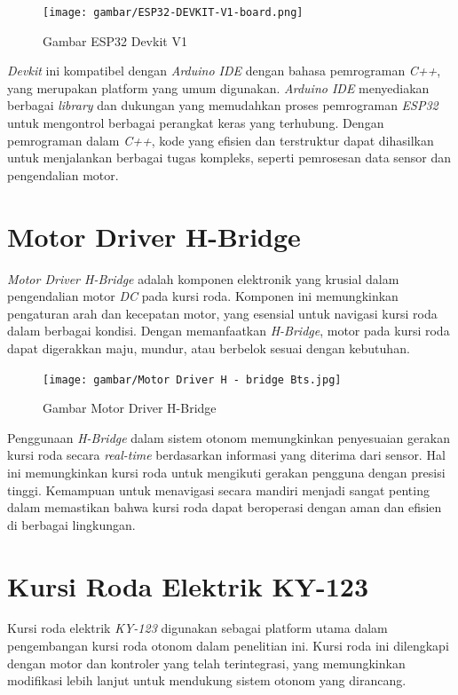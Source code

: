 \begin{figure}[H]
  \centering
  \texttt{[image: gambar/ESP32-DEVKIT-V1-board.png]}
  \caption{Gambar ESP32 Devkit V1}
  \label{fig:Gambar ESP32Devkit V1}
\end{figure}

\emph{Devkit} ini kompatibel dengan \emph{Arduino IDE} dengan bahasa pemrograman \emph{C++}, yang merupakan platform yang umum digunakan. \emph{Arduino IDE} menyediakan berbagai \emph{library} dan dukungan yang memudahkan proses pemrograman \emph{ESP32} untuk mengontrol berbagai perangkat keras yang terhubung. Dengan pemrograman dalam \emph{C++}, kode yang efisien dan terstruktur dapat dihasilkan untuk menjalankan berbagai tugas kompleks, seperti pemrosesan data sensor dan pengendalian motor.

\section{Motor Driver H-Bridge}
\label{sec:Motor}

\emph{Motor Driver H-Bridge} adalah komponen elektronik yang krusial dalam pengendalian motor \emph{DC} pada kursi roda. Komponen ini memungkinkan pengaturan arah dan kecepatan motor, yang esensial untuk navigasi kursi roda dalam berbagai kondisi. Dengan memanfaatkan \emph{H-Bridge}, motor pada kursi roda dapat digerakkan maju, mundur, atau berbelok sesuai dengan kebutuhan.

\begin{figure}[H]
  \centering
  \texttt{[image: gambar/Motor Driver H - bridge Bts.jpg]}
  \caption{Gambar Motor Driver H-Bridge}
  \label{fig:Gambar Motor Driver H-Bridge}
\end{figure}

Penggunaan \emph{H-Bridge} dalam sistem otonom memungkinkan penyesuaian gerakan kursi roda secara \emph{real-time} berdasarkan informasi yang diterima dari sensor. Hal ini memungkinkan kursi roda untuk mengikuti gerakan pengguna dengan presisi tinggi. Kemampuan untuk menavigasi secara mandiri menjadi sangat penting dalam memastikan bahwa kursi roda dapat beroperasi dengan aman dan efisien di berbagai lingkungan.

\section{Kursi Roda Elektrik KY-123}
\label{sec:KY-123}

Kursi roda elektrik \emph{KY-123} digunakan sebagai platform utama dalam pengembangan kursi roda otonom dalam penelitian ini. Kursi roda ini dilengkapi dengan motor dan kontroler yang telah terintegrasi, yang memungkinkan modifikasi lebih lanjut untuk mendukung sistem otonom yang dirancang.

